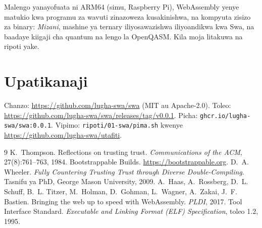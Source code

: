 \documentclass[11pt,a4paper]{article}
\begin{document}
Malengo yanayofuata ni ARM64 (simu, Raspberry Pi), WebAssembly yenye matukio kwa programu za wavuti zinazoweza kusakinishwa, na kompyuta zisizo za binary: \emph{Mizani}, mashine ya ternary iliyosawazishwa iliyoandikwa kwa Swa, na baadaye kiigaji cha quantum na lengo la OpenQASM. Kila moja litakuwa na ripoti yake.

\section*{Upatikanaji}

Chanzo: \url{https://github.com/lugha-swa/swa} (MIT au Apache-2.0). Toleo: \url{https://github.com/lugha-swa/swa/releases/tag/v0.0.1}. Picha: \texttt{ghcr.io/lugha-swa/swa:0.0.1}. Vipimo: \texttt{ripoti/01-swa/pima.sh} kwenye \url{https://github.com/lugha-swa/utafiti}.

\begin{thebibliography}{9}
 K.~Thompson. Reflections on trusting trust. \emph{Communications of the ACM}, 27(8):761--763, 1984.
 Bootstrappable Builds. \url{https://bootstrappable.org}.
 D.~A. Wheeler. \emph{Fully Countering Trusting Trust through Diverse Double-Compiling}. Tasnifu ya PhD, George Mason University, 2009.
 A.~Haas, A.~Rossberg, D.~L. Schuff, B.~L. Titzer, M.~Holman, D.~Gohman, L.~Wagner, A.~Zakai, J.~F. Bastien. Bringing the web up to speed with WebAssembly. \emph{PLDI}, 2017.
 Tool Interface Standard. \emph{Executable and Linking Format (ELF) Specification}, toleo 1.2, 1995.
\end{thebibliography}
\end{document}
